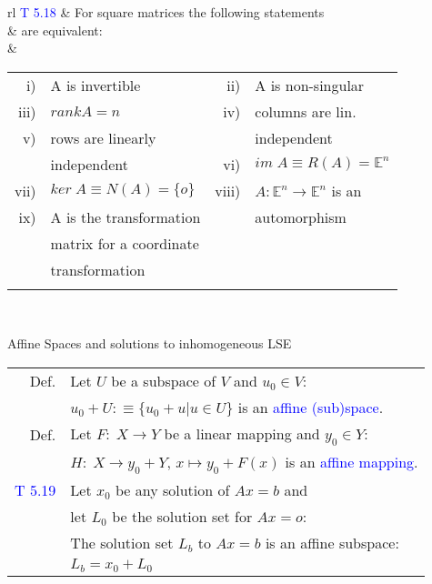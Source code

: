 \begin{mainbox}{}
\setlength{\tabcolsep}{2pt}
\begin{tabular}{rl}
	\textcolor{blue}{T 5.18} & For square matrices the following statements\\
	& are equivalent:\\
	& \begin{tabular}{rlrl}
		i) & A is invertible & ii) & A is non-singular \\
		\rule{0pt}{2ex}
		iii) & $rankA = n$ & iv) & columns are lin.\\
		\rule{0pt}{2ex}
		v) & rows are linearly & & independent\\
		\rule{0pt}{2ex}		
		& independent & vi) & $im\;A \equiv R(A) = \mathbb{E}^n$\\
		\rule{0pt}{2ex}
		vii) & $ker\;A \equiv N(A) = \{o\}$ & viii) & $A:\mathbb{E}^n\rightarrow\mathbb{E}^n$ is an\\
		\rule{0pt}{2ex}
		ix) & A is the transformation & & automorphism\\
		\rule{0pt}{2ex}
		& matrix for a coordinate & & \\
		\rule{0pt}{2ex}
		& transformation & & \\
		\rule{0pt}{2ex}
	\end{tabular}\\
\end{tabular}
\end{mainbox}

\begin{mainbox}{Affine Spaces and solutions to inhomogeneous LSE}
\setlength{\tabcolsep}{2pt}
\begin{tabular}{rl}
	Def. & Let $U$ be a subspace of $V$ and $u_0 \in V$:\\
	& $u_0 + U :\equiv \{u_0 + u | u\in U\}$ is an \textcolor{blue}{affine (sub)space}.\\
	\rule{0pt}{3ex}
	Def. & Let $F:\;X\rightarrow Y$ be a linear mapping and $y_0 \in Y$:\\
	& $H:\;X\rightarrow y_0+Y$, $x\mapsto y_0 + F(x)$ is an \textcolor{blue}{affine mapping}.\\
	\rule{0pt}{3ex}
	\textcolor{blue}{T 5.19} & Let $x_0$ be any solution of $Ax = b$ and\\
	& let $L_0$ be the solution set for $Ax = o$: \\
	& The solution set $L_b$ to $Ax = b$ is an affine subspace:\\
	& $L_b = x_0 + L_0$\\
\end{tabular}
\end{mainbox}

